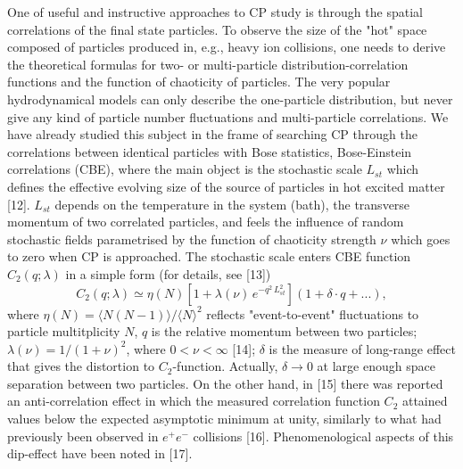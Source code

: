\documentclass[WPCF,manyauthors]{wpcfTemplate}
\begin{document}
One of useful and instructive approaches to CP study is through the spatial correlations of the final state particles.
To observe the size of the "hot" space composed of  particles produced in, e.g., heavy ion collisions, one needs to derive the theoretical formulas for two- or multi-particle distribution-correlation functions and the function of chaoticity of particles. The very popular hydrodynamical models can only describe the one-particle distribution, but never give any kind of particle number fluctuations and multi-particle correlations. We have already studied this subject in the frame of searching CP through the correlations between identical particles with Bose statistics, Bose-Einstein correlations (CBE), where the main object is the stochastic scale $L_{st}$ which defines the effective evolving size of the source of particles in hot excited matter [12]. 
$L_{st}$ depends on the temperature in the system (bath), the transverse momentum of two correlated particles, and feels the influence of random stochastic fields parametrised by the function of chaoticity strength $\nu$ which goes to zero when CP is approached. The stochastic scale enters CBE function $C_{2}(q;\lambda)$ in a simple form (for details, see [13]) 
\begin{equation}
\label{e1}
 C_{2}(q; \lambda)\simeq \eta (N) \left [1 + \lambda (\nu) \,e^{-q^{2}\, L_{st}^{2}}\right ]( 1 + \delta\cdot q + ...),
\end{equation}
where $\eta (N) = \langle N(N-1)\rangle /{\langle N\rangle}^{2}$ reflects "event-to-event" fluctuations to particle multitplicity $N$, $q$ is the relative momentum between two particles; $\lambda (\nu) = 1/(1 + \nu)^{2}$, where $0 <\nu < \infty $   [14]; $\delta$ is the measure of long-range effect that gives the distortion to $C_{2}$-function. Actually, $\delta\rightarrow 0$ at large enough space separation between two particles. On the other hand, in [15] there was reported an anti-correlation effect in which the measured correlation function $C_{2}$ attained values below the expected asymptotic minimum at unity, similarly to what had previously been observed in $e^{+}e^{-}$ collisions [16]. Phenomenological aspects of this dip-effect have been noted in [17].
\end{document}
